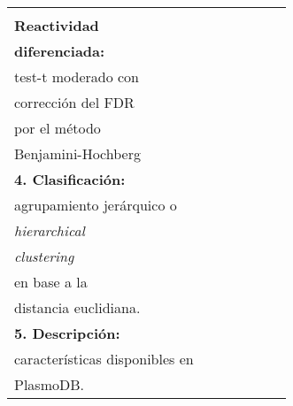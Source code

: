 \documentclass[a4paper]{article}
\begin{document}
{\begin{landscape}
\begin{center}
\begin{tabular}{|m{3.2cm}m{3.2cm}m{3.2cm}m{3.2cm}m{3.2cm}m{3.2cm}m{3.2cm}|}
\begin{minipage}{3.2cm}
  \newline
  \textbf{3.}\\ \textbf{Reactividad}\\ \textbf{diferenciada:}\\%
  test-t moderado con\\
  corrección del FDR\\por el método\\Benjamini-Hochberg\\
  \newline
  \textbf{4. Clasificación:}\\
  agrupamiento jerárquico o\\ \textit{hierarchical}\\ \textit{clustering}\\
  en base a la\\ distancia euclidiana.\\
  \newline
  \textbf{5. Descripción:}\\
  características disponibles en\\ PlasmoDB.
  \end{minipage}   
  \\
  \hline
\end{tabular}

\end{center}
    \end{landscape}
    \restoregeometry
    \clearpage
}
\end{document}

